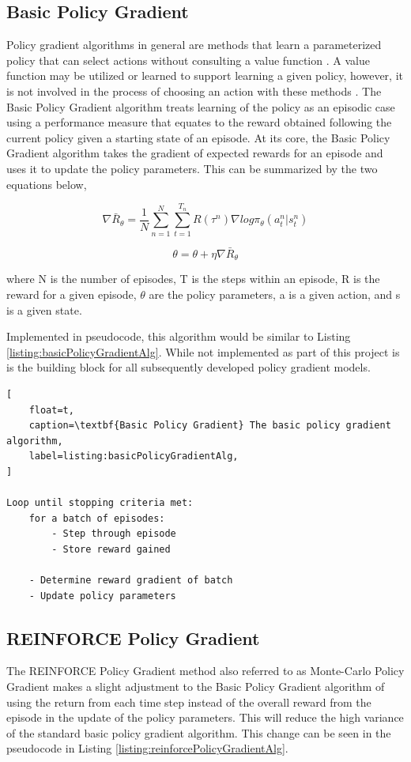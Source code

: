 \documentclass[conference]{IEEEtran}
\begin{document}
\subsection{Basic Policy Gradient}
Policy gradient algorithms in general are methods that learn a parameterized policy that can select actions without consulting a value function \cite{ReinforcementLearningBook}.
A value function may be utilized or learned to support learning a given policy, however, it is not involved in the process of choosing an action with these methods \cite{ReinforcementLearningBook}.
The Basic Policy Gradient algorithm treats learning of the policy as an episodic case using a performance measure that equates to the reward obtained following the current policy given a starting state of an episode. 
At its core, the Basic Policy Gradient algorithm takes the gradient of expected rewards for an episode and uses it to update the policy parameters.
This can be summarized by the two equations below,

$$\nabla \bar{R}_{\theta} = \frac{1}{N} \sum \limits_{n=1}^N \sum \limits_{t=1}^{T_n} R(\tau^n) \nabla log\pi_{\theta}(a_{t}^n | s_{t}^n)$$

$$\theta = \theta  + \eta \nabla \bar{R}_{\theta}$$

where N is the number of episodes, T is the steps within an episode, R is the reward for a given episode, $\theta$ are the policy parameters, a is a given action, and s is a given state.

Implemented in pseudocode, this algorithm would be similar to Listing \ref{listing:basicPolicyGradientAlg}.
While not implemented as part of this project is is the building block for all subsequently developed policy gradient models.

\begin{lstlisting}[
    float=t,
    caption=\textbf{Basic Policy Gradient} The basic policy gradient algorithm,
    label=listing:basicPolicyGradientAlg,
]

Loop until stopping criteria met:
    for a batch of episodes:
        - Step through episode
        - Store reward gained

    - Determine reward gradient of batch
    - Update policy parameters
\end{lstlisting}

\subsection{REINFORCE Policy Gradient}
The REINFORCE Policy Gradient method also referred to as Monte-Carlo Policy Gradient makes a slight adjustment to the Basic Policy Gradient algorithm of using the return from each time step instead of the overall reward from the episode in the update of the policy parameters. This will reduce the high variance of the standard basic policy gradient algorithm.
This change can be seen in the pseudocode in Listing \ref{listing:reinforcePolicyGradientAlg}. 
\end{document}
